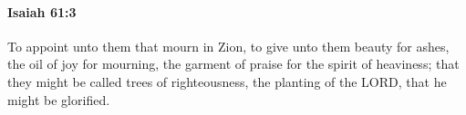 
		\paragraph{Isaiah 61:3} %
			\label{ISAIAH-61-3}

			To appoint unto them that mourn in Zion, to give unto them beauty for ashes, the oil of joy for mourning, the garment of praise for the spirit of heaviness; that they might be called trees of righteousness, the planting of the LORD, that he might be glorified.


